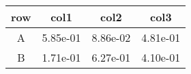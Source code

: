 \begin{tabular}{cccc}
\toprule
row&col1&col2&col3\tabularnewline
\midrule
A&5.85e-01&8.86e-02&4.81e-01\tabularnewline
B&1.71e-01&6.27e-01&4.10e-01\tabularnewline
\bottomrule
\end{tabular}
